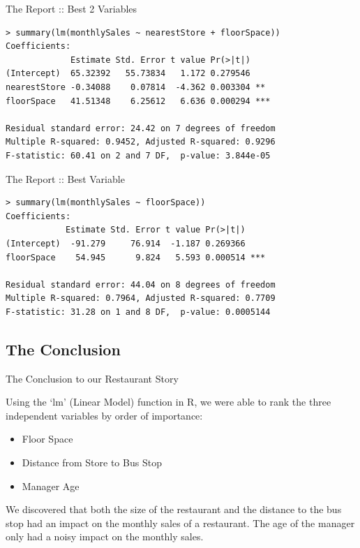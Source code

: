 \documentclass{beamer}
\begin{document}
\begin{frame}[fragile]{The Report :: Best 2 Variables}

\begin{footnotesize}
\begin{verbatim}
> summary(lm(monthlySales ~ nearestStore + floorSpace))
Coefficients:
             Estimate Std. Error t value Pr(>|t|)    
(Intercept)  65.32392   55.73834   1.172 0.279546    
nearestStore -0.34088    0.07814  -4.362 0.003304 ** 
floorSpace   41.51348    6.25612   6.636 0.000294 ***

Residual standard error: 24.42 on 7 degrees of freedom
Multiple R-squared: 0.9452, Adjusted R-squared: 0.9296 
F-statistic: 60.41 on 2 and 7 DF,  p-value: 3.844e-05
\end{verbatim}
\end{footnotesize}

\end{frame}

\begin{frame}[fragile]{The Report :: Best Variable}

\begin{footnotesize}
\begin{verbatim}
> summary(lm(monthlySales ~ floorSpace))
Coefficients:
            Estimate Std. Error t value Pr(>|t|)    
(Intercept)  -91.279     76.914  -1.187 0.269366    
floorSpace    54.945      9.824   5.593 0.000514 ***

Residual standard error: 44.04 on 8 degrees of freedom
Multiple R-squared: 0.7964, Adjusted R-squared: 0.7709 
F-statistic: 31.28 on 1 and 8 DF,  p-value: 0.0005144
\end{verbatim}
\end{footnotesize}

\end{frame}

\subsection{The Conclusion}

\begin{frame}[fragile]{The Conclusion to our Restaurant Story}

Using the `lm' (Linear Model) function in R, we were able to rank the three independent variables by order of importance:

\begin{itemize}
\item Floor Space
\item Distance from Store to Bus Stop
\item Manager Age
\end{itemize}

We discovered that both the size of the restaurant and the distance to the bus stop had an impact on the monthly sales of a restaurant. The age of the manager only had a noisy impact on the monthly sales.

\end{frame}
\end{document}

